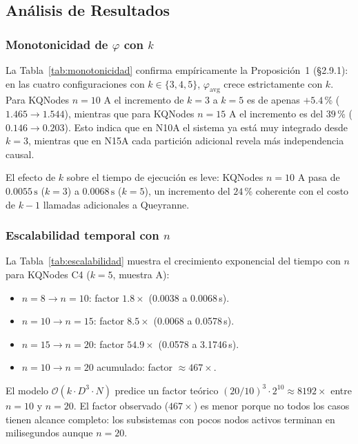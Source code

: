 \subsection{Análisis de Resultados}

\subsubsection*{Monotonicidad de $\varphi$ con $k$}

La Tabla~\ref{tab:monotonicidad} confirma empíricamente la
Proposición~1 (§2.9.1): en las cuatro configuraciones con
$k \in \{3,4,5\}$, $\varphi_{\mathrm{avg}}$ crece estrictamente con $k$.
Para KQNodes $n=10$ A el incremento de $k=3$ a $k=5$ es de apenas
$+5.4$\,\% ($1.465 \to 1.544$), mientras que para KQNodes $n=15$ A
el incremento es del $39$\,\% ($0.146 \to 0.203$).
Esto indica que en N10A el sistema ya está muy integrado desde $k=3$,
mientras que en N15A cada partición adicional revela más independencia
causal.

El efecto de $k$ sobre el tiempo de ejecución es leve:
KQNodes $n=10$ A pasa de $0.0055\,\text{s}$ ($k=3$) a
$0.0068\,\text{s}$ ($k=5$), un incremento del $24$\,\%
coherente con el costo de $k{-}1$ llamadas adicionales a Queyranne.

\subsubsection*{Escalabilidad temporal con $n$}

La Tabla~\ref{tab:escalabilidad} muestra el crecimiento exponencial
del tiempo con $n$ para KQNodes C4 ($k=5$, muestra A):

\begin{itemize}
  \item $n=8 \to n=10$: factor $1.8\times$ (0.0038 a 0.0068\,s).
  \item $n=10 \to n=15$: factor $8.5\times$ (0.0068 a 0.0578\,s).
  \item $n=15 \to n=20$: factor $54.9\times$ (0.0578 a 3.1746\,s).
  \item $n=10 \to n=20$ acumulado: factor $\approx 467\times$.
\end{itemize}

El modelo $\mathcal{O}(k \cdot D^3 \cdot N)$ predice un factor teórico
$(20/10)^3 \cdot 2^{10} \approx 8192\times$ entre $n=10$ y $n=20$.
El factor observado ($467\times$) es menor porque no todos los casos
tienen alcance completo: los subsistemas con pocos nodos activos
terminan en milisegundos aunque $n=20$.

